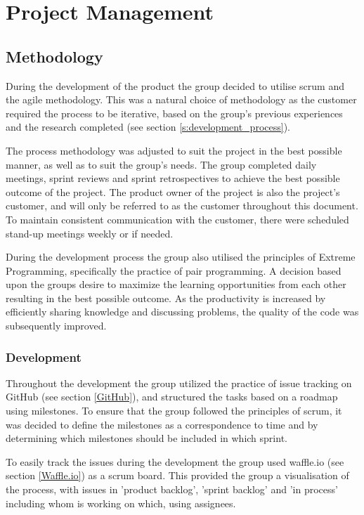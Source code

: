 
\chapter{Project Management}

\section{Methodology}
\label{methodology}
During the development of the product the group decided to utilise scrum and the agile methodology. This was a natural choice of methodology as the customer required the process to be iterative, based on the group's previous experiences and the research completed (see section \ref{s:development_process}). 

The process methodology was adjusted to suit the project in the best possible manner, as well as to suit the group's needs. The group completed daily meetings, sprint reviews and sprint retrospectives to achieve the best possible outcome of the project. The product owner of the project is also the project's customer, and will only be referred to as the customer throughout this document. To maintain consistent communication with the customer, there were scheduled stand-up meetings weekly or if needed. 

During the development process the group also utilised the principles of Extreme Programming, specifically the practice of pair programming. A decision based upon the groups desire to maximize the learning opportunities from each other resulting in the best possible outcome. As the productivity is increased by efficiently sharing knowledge and discussing problems, the quality of the code was subsequently improved.  

\subsection{Development}
Throughout the development the group utilized the practice of issue tracking on GitHub (see section \ref{GitHub}), and structured the tasks based on a roadmap using milestones. 
To ensure that the group followed the principles of scrum, it was decided to define the milestones as a correspondence to time and by determining which milestones should be included in which sprint. 

To easily track the issues during the development the group used waffle.io (see section \ref{Waffle.io}) as a scrum board. This provided the group a visualisation of the process, with issues in 'product backlog', 'sprint backlog' and 'in process' including whom is working on which, using assignees. 

